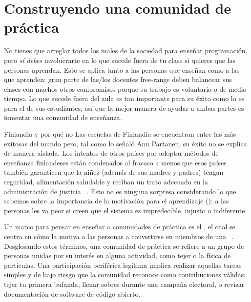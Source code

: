 \chapter{Construyendo una comunidad de práctica}\label{s:community}

No tienes que arreglar todos los males de la sociedad para enseñar programación,
pero \emph{sí debes} involucrarte en
lo que sucede fuera de tu clase si quieres que las personas aprendan.
Esto se aplica tanto a las personas que enseñan como a las que aprenden:
gran parte de las/los docentes free-range deben balancear  sus clases con muchos otros compromisos
porque su trabajo es voluntario o de medio tiempo.
Lo que sucede fuera del aula es tan importante para su éxito
como lo es para el de sus estudiantes,
así que la mejor manera de ayudar a ambas partes es fomentar una comunidad de enseñanza.


\begin{aside}{Finlandia y por qué no}
Las escuelas de Finlandia se encuentran entre las más exitosas del mundo
pero, tal como lo señaló Anu Partanen,
su éxito no se explica de manera aislada.
  Los intentos de otros países por adoptar métodos de enseñanza finlandeses están condenados al fracaso
  a menos que esos países también garanticen que la niñez (además de sus madres y padres) tengan seguridad, alimentación saludable y reciban un trato adecuado en la administración de justicia ~\cite{Sahl2015, Wilk2011}.
  Esto no es ninguna sorpresa considerando lo que sabemos sobre la importancia de la motivación para el aprendizaje ():
  a las personas les va peor si creen que el sistema es impredecible, injusto o indiferente.
\end{aside}

Un marco para pensar en enseñar a comunidades de práctica es el ,
el cual se centra en cómo la 
motiva a las personas a convertirse en miembros de
una ~\cite{Weng2015}.
Desglosando estos términos,
una comunidad de práctica se refiere a  un grupo de personas unidas por su interés en alguna actividad,
como tejer o la física de partículas.
Una  participación periférica legítima implica realizar aquellas tareas simples y de bajo riesgo
que la comunidad reconoce como contribuciones válidas:
tejer tu primera bufanda,
llenar sobres durante una campaña electoral,
o revisar documentación de software de código abierto.

